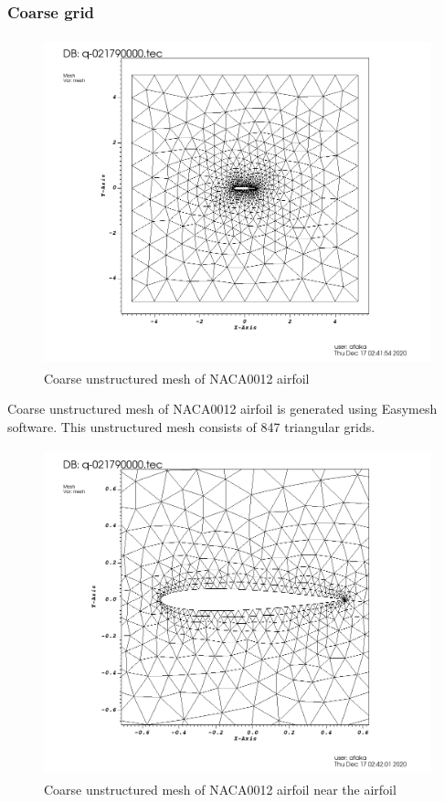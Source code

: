 \documentclass[letterpaper,12pt]{article}
\begin{document}
\subsubsection{Coarse grid}

\begin{figure} [!h]
	\centering
	\includegraphics[height = 9.5cm]{graph/coarse/coarse_8470000.png}
	\caption{Coarse unstructured mesh of NACA0012 airfoil}
    \label{fig:airfoilmeshcoarse}
\end{figure}

\vspace{2cm}

Coarse unstructured mesh of NACA0012 airfoil is generated using Easymesh software. This 
unstructured mesh consists of 847 triangular grids.

\newpage

\begin{figure} [!h]
	\centering
	\includegraphics[height = 9.5cm]{graph/coarse/coarse_8470001.png}
	\caption{Coarse unstructured mesh of NACA0012 airfoil near the airfoil}
    \label{fig:airfoilmeshcoarseclose}
\end{figure}
\end{document}
